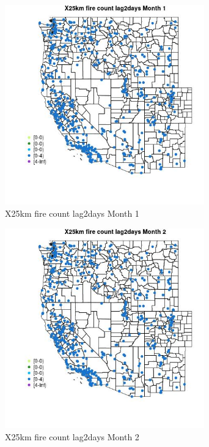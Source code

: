 \begin{figure} 
\centering  
\includegraphics[width=0.77\textwidth]{Code_Outputs/Report_ML_input_PM25_Step4_part_e_de_duplicated_aves_compiled_2019-05-14wNAs_MapObsMo1X25km_fire_count_lag2days.jpg} 
\caption{\label{fig:Report_ML_input_PM25_Step4_part_e_de_duplicated_aves_compiled_2019-05-14wNAsMapObsMo1X25km_fire_count_lag2days}X25km fire count lag2days Month 1} 
\end{figure} 
 

\begin{figure} 
\centering  
\includegraphics[width=0.77\textwidth]{Code_Outputs/Report_ML_input_PM25_Step4_part_e_de_duplicated_aves_compiled_2019-05-14wNAs_MapObsMo2X25km_fire_count_lag2days.jpg} 
\caption{\label{fig:Report_ML_input_PM25_Step4_part_e_de_duplicated_aves_compiled_2019-05-14wNAsMapObsMo2X25km_fire_count_lag2days}X25km fire count lag2days Month 2} 
\end{figure} 
 

